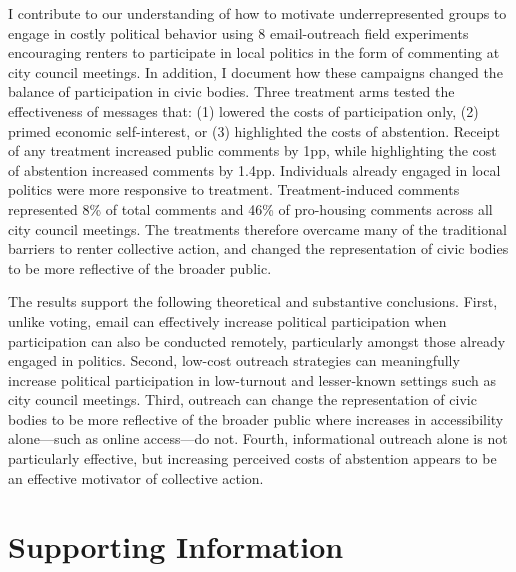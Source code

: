 \documentclass[12pt,final,fleqn]{article}
\theoremstyle{plain}
\begin{document}
I contribute to our understanding of how to motivate underrepresented groups to engage in costly political behavior using 8 email-outreach field experiments encouraging renters to participate in local politics in the form of commenting at city council meetings. In addition, I document how these  campaigns changed the balance of participation in civic bodies. Three treatment arms tested the effectiveness of messages that: (1) lowered the costs of participation only, (2) primed economic self-interest, or (3) highlighted the costs of abstention. Receipt of any treatment increased public comments by 1pp, while highlighting the cost of abstention increased comments by 1.4pp.  Individuals already engaged in local politics were more responsive to treatment. Treatment-induced comments represented 8\% of total comments and 46\% of pro-housing comments across all city council meetings. The treatments therefore overcame many of the traditional barriers to renter collective action, and changed the representation of civic bodies to be more reflective of the broader public. 

The results support the following theoretical and substantive conclusions. First, unlike voting, email can effectively increase political participation when participation can also be conducted remotely, particularly amongst those already engaged in politics. Second, low-cost outreach strategies can meaningfully increase political participation in low-turnout and lesser-known settings such as city council meetings. Third, outreach can change the representation of civic bodies to be more reflective of the broader public where increases in accessibility alone---such as online access---do not. Fourth, informational outreach alone is not particularly effective, but increasing perceived costs of abstention appears to be an effective motivator of collective action.

\clearpage
\pagebreak

\singlespace
{}


\singlespace
\newpage
\appendix
{} %
\part{\Large{Supporting Information}}%
\parttoc 
\end{document}
